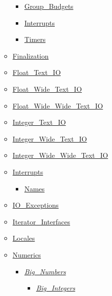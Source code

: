 \begin{scriptsize}
\begin{multicols*}{\columnnr}
\begin{itemize}[leftmargin=0mm]
\begin{itemize}[leftmargin=5mm]
\begin{itemize}[leftmargin=5mm]
	\item[] \href{http://www.ada-auth.org/standards/22rm/html/RM-D-14-2.html}{Group\_Budgets}
	\item[] \href{http://www.ada-auth.org/standards/22rm/html/RM-D-14-3.html}{Interrupts}
	\item[] \href{http://www.ada-auth.org/standards/22rm/html/RM-D-14-1.html}{Timers}
	\end{itemize}
  \item[] \href{http://www.ada-auth.org/standards/22rm/html/RM-7-6.html}{Finalization}
  \item[] \href{http://www.ada-auth.org/standards/22rm/html/RM-A-10-9.html}{Float\_Text\_IO}
  \item[] \href{http://www.ada-auth.org/standards/22rm/html/RM-A-11.html}{Float\_Wide\_Text\_IO}
  \item[] \href{http://www.ada-auth.org/standards/22rm/html/RM-A-11.html}{Float\_Wide\_Wide\_Text\_IO}
  \item[] \href{http://www.ada-auth.org/standards/22rm/html/RM-A-10-8.html}{Integer\_Text\_IO}
  \item[] \href{http://www.ada-auth.org/standards/22rm/html/RM-A-11.html}{Integer\_Wide\_Text\_IO}
  \item[] \href{http://www.ada-auth.org/standards/22rm/html/RM-A-11.html}{Integer\_Wide\_Wide\_Text\_IO}
  \item[] \href{http://www.ada-auth.org/standards/22rm/html/RM-C-3-2.html}{Interrupts}
	\begin{itemize}[leftmargin=5mm]
	\item[] \href{http://www.ada-auth.org/standards/22rm/html/RM-C-3-2.html}{Names}
	\end{itemize}
  \item[] \href{http://www.ada-auth.org/standards/22rm/html/RM-A-13.html}{IO\_Exceptions}
  \item[] \href{http://www.ada-auth.org/standards/22rm/html/RM-5-5-1.html}{Iterator\_Interfaces}
  \item[] \href{http://www.ada-auth.org/standards/22rm/html/RM-A-19.html}{Locales}
  \item[] \href{http://www.ada-auth.org/standards/22rm/html/RM-A-5.html}{Numerics}
	\begin{itemize}[leftmargin=5mm]
	\item[] \href{http://www.ada-auth.org/standards/22rm/html/RM-A-5-5.html}{\textit{Big\_Numbers}}
	  \begin{itemize}[leftmargin=5mm]
	  \item[] \href{http://www.ada-auth.org/standards/22rm/html/RM-A-5-6.html}{\textit{Big\_Integers}}

\end{itemize}
\end{itemize}
\end{itemize}
\end{itemize}
\end{multicols*}
\end{scriptsize}
